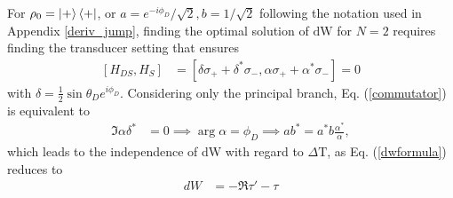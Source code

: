 For $\rho_0 = \ket{+} \bra{+}$, or $a = e^{-i \phi_D}/\sqrt{2}, b = 1/\sqrt{2}$ following the notation used in Appendix \ref{deriv_jump}, finding the optimal solution of $\mathrm{dW}$ for $N = 2$ requires finding the transducer setting that ensures
\begin{align}\label{commutator}
	[H_{DS}, H_S] &= [\delta \sigma_{+} + \delta^* \sigma_{-}, \alpha \sigma_{+} + \alpha^* \sigma_{-}] = 0
\end{align}
with $\delta = \frac{1}{2} \sin{\theta_D} e^{i \phi_D}$.
Considering only the principal branch, Eq. (\ref{commutator}) is equivalent to
\begin{align*}
	\Im{\alpha \delta^*} &= 0 \implies \arg{\alpha} = \phi_D \implies a b^* = a^* b \frac{\alpha^*}{\alpha},
\end{align*}
which leads to the independence of dW with regard to $\Delta \mathrm{T}$, as Eq. (\ref{dwformula}) reduces to
\begin{align*}
	dW &= - \Re{\tau' - \tau}
\end{align*}